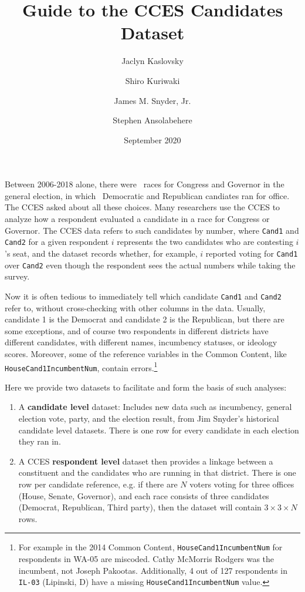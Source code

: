 \documentclass[12pt]{article}
\title{\large\textbf{Guide to the CCES Candidates Dataset}}
\author[1]{\normalsize Jaclyn Kaslovsky}
\author[2]{\normalsize Shiro Kuriwaki}
\author[2]{\normalsize James M. Snyder, Jr.}
\author[2]{\normalsize Stephen Ansolabehere}
\affil[1]{\footnotesize Center for the Study of Democratic Politics, Princeton University.}
\affil[2]{\footnotesize Department of Government, Harvard University.}
\date{\normalsize September 2020}
\begin{document}
\maketitle 


Between 2006-2018 alone, there were \unskip \ races for Congress and Governor in the general election, in which \unskip \ Democratic and Republican candiates ran for office. The CCES asked about all these choices. Many researchers use the CCES to analyze how a respondent evaluated a candidate in a race for Congress or Governor. The CCES data refers to such candidates by number, where \texttt{Cand1} and \texttt{Cand2}  for a given respondent \(i\) represents the two candidates who are contesting \(i\)'s seat, and the dataset records whether, for example, \(i\) reported voting for \texttt{Cand1} over \texttt{Cand2} even though the respondent sees the actual numbers while taking the survey.  


Now it is often tedious to immediately tell which candidate \texttt{Cand1} and \texttt{Cand2} refer to, without cross-checking with other columns in the data. Usually, candidate 1 is the Democrat and candidate 2 is the Republican, but there are some exceptions, and of course two respondents in different districts have different candidates, with different names, incumbency statuses, or ideology scores. Moreover, some of the reference variables in the Common Content, like \texttt{HouseCand1IncumbentNum}, contain errors.\footnote{For example in the 2014 Common Content, \texttt{HouseCand1IncumbentNum} for respondents in WA-05 are miscoded. Cathy McMorris Rodgers was the incumbent, not Joseph Pakootas. Additionally, 4 out of 127 respondents in \texttt{IL-03} (Lipinski, D) have a missing \texttt{HouseCand1IncumbentNum} value.}

\noindent Here we provide two datasets to facilitate and form the basis of such analyses:
\begin{enumerate}
\item A \textbf{candidate level} dataset: Includes new data such as incumbency, general election vote, party, and the election result, from Jim Snyder's historical candidate level datasets. There is one row for every candidate in each election they ran in. 
\item A CCES \textbf{respondent level} dataset then provides a linkage between a constituent and the candidates who are running in that district. There is one row per candidate reference, e.g. if there are $N$ voters voting for three offices (House, Senate, Governor), and each race consists of three candidates (Democrat, Republican, Third party), then the dataset will contain $3\times3\times N$ rows.
\end{enumerate}
\end{document}
